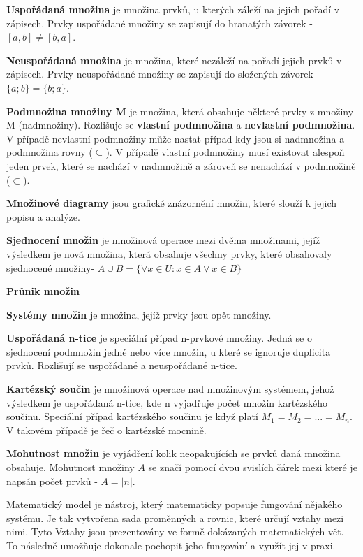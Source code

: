 {\bf Uspořádaná množina} je množina prvků, u kterých záleží na jejich pořadí v zápisech. Prvky uspořádané množiny se zapisují do hranatých závorek - $[a, b] \ne [b, a]$.

{\bf Neuspořádaná množina} je množina, které nezáleží na pořadí jejich prvků v zápisech. Prvky neuspořádané množiny se zapisují do složených závorek - $\{a; b\} = \{b; a\}$.  

{\bf Podmnožina množiny M} je množina, která obsahuje některé prvky z množiny M (nadmnožiny). Rozlišuje se {\bf vlastní podmnožina} a {\bf nevlastní podmnožina}. V případě nevlastní podmnožiny může nastat případ kdy jsou si nadmnožina a podmnožina rovny ($\subseteq$). V případě vlastní podmnožiny musí existovat alespoň jeden prvek, které se nachází v nadmnožině a zároveň se nenachází v podmnožině ($\subset$).

{\bf Množinové diagramy} jsou grafické znázornění množin, které slouží k jejich popisu a analýze. 

{\bf Sjednocení množin} je množinová operace mezi dvěma množinami, jejíž výsledkem je nová množina, která obsahuje všechny prvky, které obsahovaly sjednocené množiny- $ A \cup B = \{\forall x \in U : x \in A \vee x \in B \} $

{\bf Průnik množin} 

{\bf Systémy množin} je množina, jejíž prvky jsou opět množiny.

{\bf Uspořádaná n-tice} je speciální případ n-prvkové množiny. Jedná se o sjednocení podmnožin jedné nebo více množin, u které se ignoruje duplicita prvků. Rozlišují se uspořádané a neuspořádané n-tice.

{\bf Kartézský součin} je množinová operace nad množinovým systémem, jehož výsledkem je uspořádaná n-tice, kde n vyjadřuje počet množin kartézského součinu. Speciální případ kartézského součinu je když platí $M_1 = M_2 = ... = M_n$. V takovém případě je řeč o kartézské mocnině.

{\bf Mohutnost množin} je vyjádření kolik neopakujících se prvků daná množina obsahuje. Mohutnost množiny $A$ se značí pomocí dvou svislích čárek mezi které je napsán počet prvků - $A = |n|$.










Matematický model je nástroj, který matematicky popsuje fungování nějakého systému. Je tak vytvořena sada proměnných a rovnic, které určují vztahy mezi nimi. Tyto Vztahy jsou prezentovány ve formě dokázaných matematických vět. To následně umožňuje dokonale pochopit jeho fungování a využít jej v praxi. 

